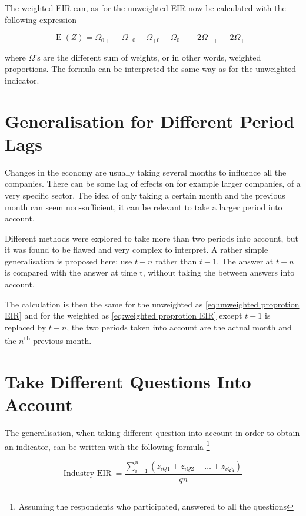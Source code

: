\documentclass[12pt,a4paper,oneside]{book}
\DeclareMathOperator{\E}{E}
\begin{document}
The weighted EIR can, as for the unweighted EIR now be calculated with the following expression 

\begin{equation}
    \E(Z) = \Omega_{0+} + \Omega_{-0} - \Omega_{+0} - \Omega_{0-} +2\Omega_{-+} -2\Omega_{+-} \label{eq:weighted proprotion EIR}
\end{equation}

where $\Omega$'s are the different sum of weights, or in other words, weighted proportions.
The formula can be interpreted the same way as for the unweighted indicator.


\section{Generalisation for Different Period Lags}

Changes in the economy are usually taking several months to influence all the companies. There can be some lag of effects on for example larger companies, of a very specific sector.
The idea of only taking a certain month and the previous month can seem non-sufficient, it can be relevant to take a larger period into account.

Different methods were explored to take more than two periods into account, but it was found to be flawed and very complex to interpret.
A rather simple generalisation is proposed here; use $t-n$ rather than $t-1$. 
The answer at $t-n$ is compared with the answer at time t, without taking the between answers into account.

The calculation is then the same for the unweighted as \autoref{eq:unweighted proprotion EIR} and for the weighted as \autoref{eq:weighted proprotion EIR} except $t-1$ is replaced by $t-n$, the two periods taken into account are the actual month and the $n$\textsuperscript{th} previous month.


\section{Take Different Questions Into Account}

The generalisation, when taking different question into account in order to obtain an indicator, can be written with the following formula \footnote{Assuming the respondents who participated, answered to all the questions}

\begin{equation}
    \mbox{Industry EIR}\ = \frac{\sum_{i=1}^n \left(z_{i Q1} + z_{i Q2} + \ldots + z_{i Qq} \right)}{qn}
\end{equation}
\end{document}
